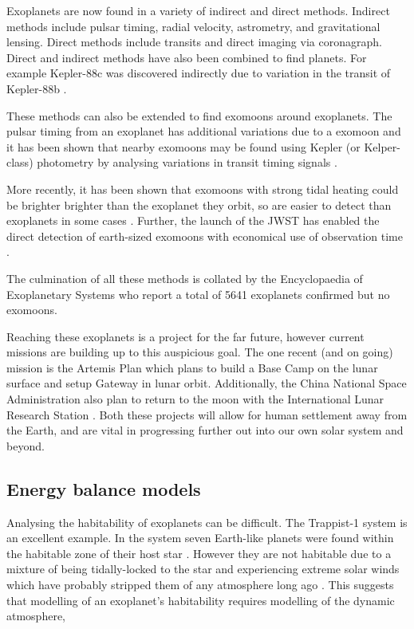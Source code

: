 \documentclass[12pt, onecolumn]{revtex4-2}    %
\begin{document}
Exoplanets are now found in a variety of indirect and direct methods.
Indirect methods include pulsar timing, radial velocity, astrometry, and gravitational lensing.
Direct methods include transits and direct imaging via coronagraph.
Direct and indirect methods have also been combined to find planets. 
For example Kepler-88c was discovered indirectly due to variation in the transit of Kepler-88b \cite{Nesvorny2013}.

These methods can also be extended to find exomoons around exoplanets.
The pulsar timing from an exoplanet has additional variations due to a exomoon \cite{Lewis2008} and it has been shown that nearby exomoons may be found using Kepler (or Kelper-class) photometry by analysing variations in transit timing signals \cite{KSG2009}.

More recently, it has been shown that exomoons with strong tidal heating could be brighter brighter than the exoplanet they orbit, so are easier to detect than exoplanets in some cases \cite{LimTurn2013}.
Further, the launch of the JWST has enabled the direct detection of earth-sized exomoons with economical use of observation time \cite{Limbach2021}.

The culmination of all these methods is collated by the Encyclopaedia of Exoplanetary Systems \cite{ExoEu} who report a total of 5641 exoplanets confirmed but no exomoons.

Reaching these exoplanets is a project for the far future, however current missions are building up to this auspicious goal.
The one recent (and on going) mission is the Artemis Plan \cite{NASA_Artemis} which plans to build a Base Camp on the lunar surface and setup Gateway in lunar orbit.
Additionally, the China National Space Administration also plan to return to the moon with the International Lunar Research Station \cite{CNSA_ILRS}.
Both these projects will allow for human settlement away from the Earth, and are vital in progressing further out into our own solar system and beyond.

\subsection{Energy balance models} \label{ssec:EBM_intro}
Analysing the habitability of exoplanets can be difficult.
The Trappist-1 system is an excellent example. In the system seven Earth-like planets were found within the habitable zone of their host star \cite{GTD2017}.
However they are not habitable due to a mixture of being tidally-locked to the star and experiencing extreme solar winds which have probably stripped them of any atmosphere long ago \cite{Cohen2024, VanLooveren2024}.
This suggests that modelling of an exoplanet's habitability requires modelling of the dynamic atmosphere,
\end{document}
